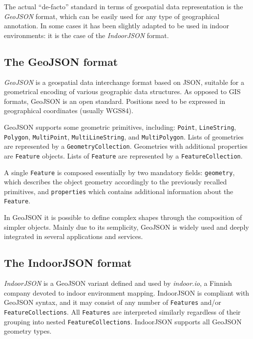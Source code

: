 The actual ``de-facto'' standard in terms of geospatial data representation is
the \emph{GeoJSON} format, which can be easily used for any type of geographical
annotation. In some cases it has been slightly adapted to be used in indoor
environments: it is the case of the \emph{IndoorJSON} format.

\subsection{The GeoJSON format}\label{the-geojson-format}

\emph{GeoJSON} is a geospatial data interchange format based on JSON, suitable for a
geometrical encoding of various geographic data structures. As opposed to GIS
formats, GeoJSON is an open standard. Positions need to be expressed in
geographical coordinates (usually WGS84).

GeoJSON supports some geometric primitives, including: {\tt Point},
{\tt Line\-String}, {\tt Polygon}, {\tt MultiPoint},
{\tt MultiLineString}, and {\tt MultiPolygon}. Lists of geometries are
represented by a {\tt GeometryCollection}. Geometries with additional
properties are {\tt Feature} objects. Lists of {\tt Feature} are
represented by a {\tt FeatureCollection}.

A single {\tt Feature} is composed essentially by two mandatory fields:
{\tt geometry}, which describes the object geometry accordingly to the
previously recalled primitives, and {\tt properties} which contains
additional information about the {\tt Feature}.

In GeoJSON it is possible to define complex shapes through the composition of simpler
 objects. Mainly due to its semplicity, GeoJSON is widely used and
deeply integrated in several applications and services.

\subsection{The IndoorJSON format}\label{experiences-on-indoor-json}

\emph{IndoorJSON} is a GeoJSON variant defined and used by \emph{indoor.io}, a
Finnish company devoted to indoor environment mapping. IndoorJSON is compliant
with GeoJSON syntax, and it may consist of any number of {\tt Features}
and/or {\tt FeatureCollections}. All {\tt Features} are interpreted
similarly regardless of their grouping into nested
{\tt FeatureCollections}. IndoorJSON supports all GeoJSON geometry types.


